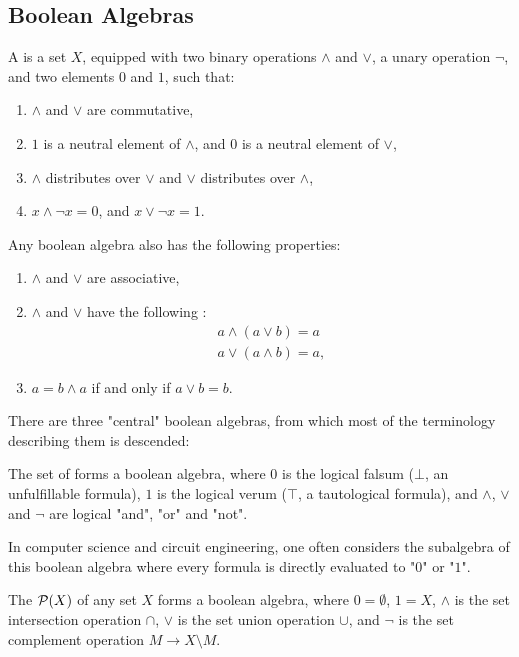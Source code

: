 \subsection{Boolean Algebras}
\begin{definition}
	A  is a set $X$, equipped with two binary operations $\wedge$ and $\vee$, a unary operation $\neg$, and two elements $0$ and $1$, such that:
	\begin{enumerate}
		\item $\wedge$ and $\vee$ are commutative,
		\item $1$ is a neutral element of $\wedge$, and $0$ is a neutral element of $\vee$,
		\item $\wedge$ distributes over $\vee$ and $\vee$ distributes over $\wedge$,
		\item $x \wedge \neg x = 0$, and $x \vee \neg x = 1$.
	\end{enumerate}
\end{definition}
\begin{corollary}
	Any boolean algebra also has the following properties:
	\begin{enumerate}
		\item $\wedge$ and $\vee$ are associative,
		\item $\wedge$ and $\vee$ have the following :
		\begin{align*}
			a \wedge (a \vee b) = a\\
			a \vee (a \wedge b) = a,
		\end{align*}
		\item $a = b \wedge a$ if and only if $a \vee b = b$.
	\end{enumerate}
\end{corollary}
There are three "central" boolean algebras, from which most of the terminology describing them is descended:
\begin{theorem}
	The set of  forms a boolean algebra, where $0$ is the logical falsum ($\bot$, an unfulfillable formula), $1$ is the logical verum ($\top$, a tautological formula), and $\wedge$, $\vee$ and $\neg$ are logical "and", "or" and "not".
\end{theorem}
In computer science and circuit engineering, one often considers the subalgebra of this boolean algebra where every formula is directly evaluated to "$0$" or "$1$".
\begin{theorem}
	The  $\mathcal{P}(X)$ of any set $X$ forms a boolean algebra, where $0 = \emptyset$, $1 = X$, $\wedge$ is the set intersection operation $\cap$, $\vee$ is the set union operation $\cup$, and $\neg$ is the set complement operation $M \to X \setminus M$.
\end{theorem}
